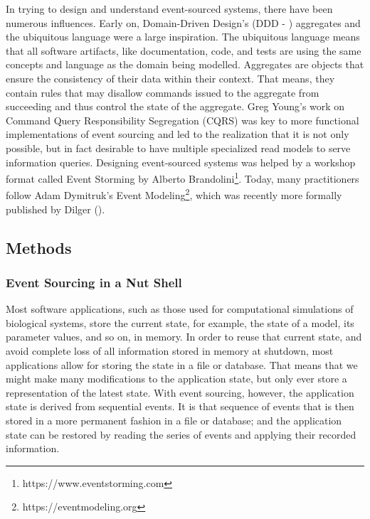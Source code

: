 \documentclass[
  a4paper,
]{scrartcl}
\begin{document}
In trying to design and understand event-sourced systems, there have
been numerous influences. Early on, Domain-Driven Design's (DDD -
) aggregates and the
ubiquitous language were a large inspiration. The ubiquitous language
means that all software artifacts, like documentation, code, and tests
are using the same concepts and language as the domain being modelled.
Aggregates are objects that ensure the consistency of their data within
their context. That means, they contain rules that may disallow commands
issued to the aggregate from succeeding and thus control the state of
the aggregate. Greg Young's work on Command Query Responsibility
Segregation (CQRS) was key to more functional implementations of event
sourcing and led to the realization that it is not only possible, but in
fact desirable to have multiple specialized read models to serve
information queries. Designing event-sourced systems was helped by a
workshop format called Event Storming by Alberto Brandolini\footnote{https://www.eventstorming.com}.
Today, many practitioners follow Adam Dymitruk's Event
Modeling\footnote{https://eventmodeling.org}, which was recently more
formally published by Dilger
().

\subsection{Methods}\label{methods}

\subsubsection{Event Sourcing in a Nut
Shell}\label{event-sourcing-in-a-nut-shell}

Most software applications, such as those used for computational
simulations of biological systems, store the current state, for example,
the state of a model, its parameter values, and so on, in memory. In
order to reuse that current state, and avoid complete loss of all
information stored in memory at shutdown, most applications allow for
storing the state in a file or database. That means that we might make
many modifications to the application state, but only ever store a
representation of the latest state. With event sourcing, however, the
application state is derived from sequential events. It is that sequence
of events that is then stored in a more permanent fashion in a file or
database; and the application state can be restored by reading the
series of events and applying their recorded information.
\end{document}
